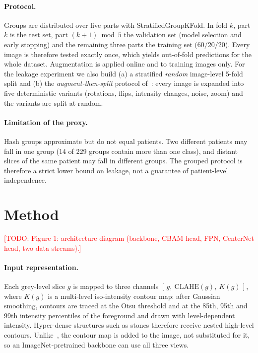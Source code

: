 \documentclass[11pt]{article}
\newcommand{\todo}[1]{\textcolor{red}{[TODO: #1]}}
\begin{document}
\paragraph{Protocol.} Groups are distributed over five parts with StratifiedGroupKFold. In fold $k$, part $k$ is
the test set, part $(k{+}1)\bmod 5$ the validation set (model selection and early stopping) and the remaining three
parts the training set (60/20/20). Every image is therefore tested exactly once, which yields out-of-fold
predictions for the whole dataset. Augmentation is applied online and to training images only. For the leakage
experiment we also build (a) a stratified \emph{random} image-level 5-fold split and (b) the \emph{augment-then-split}
protocol of~\citep{devi2025cdr}: every image is expanded into five deterministic variants (rotations, flips,
intensity changes, noise, zoom) and the variants are split at random.

\paragraph{Limitation of the proxy.} Hash groups approximate but do not equal patients. Two different patients
may fall in one group (14 of 229 groups contain more than one class), and distant slices of the same patient may
fall in different groups. The grouped protocol is therefore a strict lower bound on leakage, not a guarantee of
patient-level independence.

\section{Method}\label{sec:method}
\todo{Figure 1: architecture diagram (backbone, CBAM head, FPN, CenterNet head, two data streams).}

\paragraph{Input representation.} Each grey-level slice $g$ is mapped to three channels
$[\,g,\ \mathrm{CLAHE}(g),\ K(g)\,]$, where $K(g)$ is a multi-level iso-intensity contour map: after Gaussian
smoothing, contours are traced at the Otsu threshold and at the 85th, 95th and 99th intensity percentiles of the
foreground and drawn with level-dependent intensity. Hyper-dense structures such as stones therefore receive
nested high-level contours. Unlike~\citep{devi2025cdr}, the contour map is added to the image, not substituted
for it, so an ImageNet-pretrained backbone can use all three views.
\end{document}
